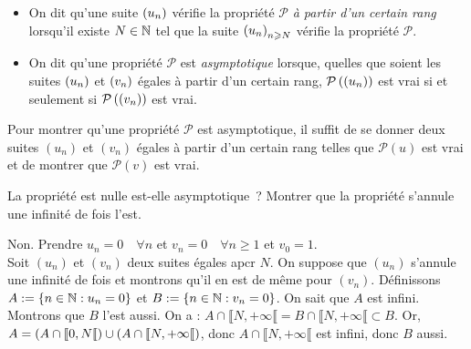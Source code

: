 \documentclass{magnolia}
\begin{document}
\begin{definition}[utile=-3]
\begin{itemize}
\item On dit qu'une suite $\left(u_n\right)$ vérifie la propriété $\mathcal{P}$ \emph{à partir
  d'un certain rang} lorsqu'il existe $N\in\mathbb{N}$ tel que la suite
  $\left(u_n\right)_{n\geqslant N}$ vérifie la propriété $\mathcal{P}$.
\item On dit qu'une propriété $\mathcal{P}$ est \emph{asymptotique} lorsque, quelles que
  soient les suites $\left(u_n\right)$ et $\left(v_n\right)$ égales à partir d'un certain rang,
  $\mathcal{P}\left(\left(u_n\right)\right)$ est vrai si et seulement si $\mathcal{P}\left(\left(v_n\right)\right)$
  est vrai.
\end{itemize}
\end{definition}

\begin{remarqueUnique}
\remarque Pour montrer qu'une propriété $\mathcal{P}$ est asymptotique, il
  suffit de se donner deux suites $(u_n)$ et $(v_n)$ égales à partir d'un
  certain rang telles que $\mathcal{P}(u)$ est vrai et de montrer que
  $\mathcal{P}(v)$ est vrai.
\end{remarqueUnique}

\begin{exoUnique}
\exo La propriété \og est nulle \fg est-elle asymptotique~? Montrer que la
  propriété \og s'annule une infinité de fois \fg l'est.
\end{exoUnique}

\begin{sol}
Non. Prendre $u_n=0 \quad \forall n$ et $v_n=0 \quad \forall n\geq 1$ et $v_0=1$.\\
Soit $(u_n)$ et $(v_n)$ deux suites égales apcr $N$. On suppose que $(u_n)$ s'annule une infinité de fois et montrons qu'il en est de même pour $(v_n)$. Définissons $A:=\left\{n\in\mathbb{N} : u_n=0\right\}$ et $B:=\left\{n\in\mathbb{N} : v_n=0\right\}$. On sait que $A$ est infini. Montrons que $B$ l'est aussi.
On a : $A\cap \llbracket N,+\infty \llbracket=B\cap \llbracket N,+\infty \llbracket \subset B.$ Or, $A=\left(A\cap \llbracket 0,N \llbracket \right)\cup \left(A\cap \llbracket N,+\infty \llbracket\right)$, donc $A\cap \llbracket N,+\infty \llbracket$ est infini, donc $B$ aussi.

\end{sol}

\end{document}
